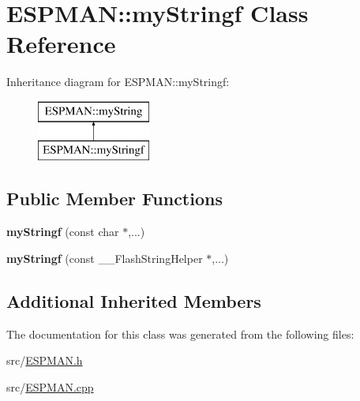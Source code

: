 \hypertarget{class_e_s_p_m_a_n_1_1my_stringf}{}\section{E\+S\+P\+M\+AN\+:\+:my\+Stringf Class Reference}
\label{class_e_s_p_m_a_n_1_1my_stringf}
Inheritance diagram for E\+S\+P\+M\+AN\+:\+:my\+Stringf\+:\begin{figure}[H]
\begin{center}
\leavevmode
\includegraphics[height=2.000000cm]{class_e_s_p_m_a_n_1_1my_stringf}
\end{center}
\end{figure}
\subsection*{Public Member Functions}
\begin{DoxyCompactItemize}
\item 
\mbox{\label{class_e_s_p_m_a_n_1_1my_stringf_a813bf9ec5007da9c6b4ad1026a8e2983}} 
{\bfseries my\+Stringf} (const char $\ast$,...)
\item 
\mbox{\label{class_e_s_p_m_a_n_1_1my_stringf_a5ca16b84f917e7bf72058aa929540611}} 
{\bfseries my\+Stringf} (const \+\_\+\+\_\+\+Flash\+String\+Helper $\ast$,...)
\end{DoxyCompactItemize}
\subsection*{Additional Inherited Members}


The documentation for this class was generated from the following files\+:\begin{DoxyCompactItemize}
\item 
src/\hyperlink{_e_s_p_m_a_n_8h}{E\+S\+P\+M\+A\+N.\+h}\item 
src/\hyperlink{_e_s_p_m_a_n_8cpp}{E\+S\+P\+M\+A\+N.\+cpp}\end{DoxyCompactItemize}
